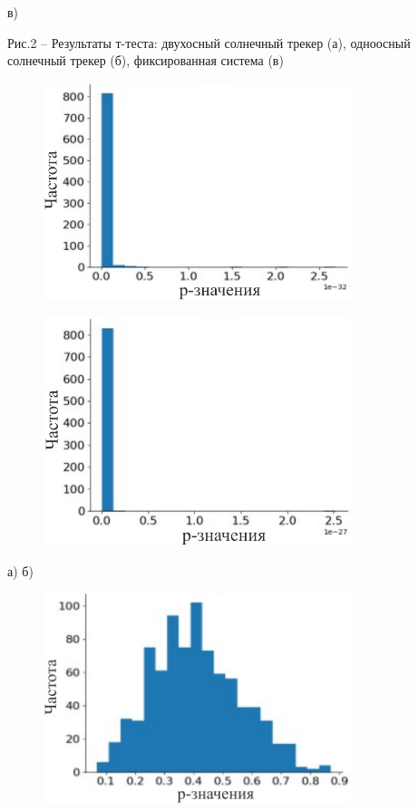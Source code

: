 в)

Рис.2 -- Результаты т-теста: двухосный солнечный трекер (а), одноосный
солнечный трекер (б), фиксированная система (в)


\begin{figure}[H]
	\centering
	\includegraphics[width=0.8\textwidth]{media/ict/image7}
	\caption*{}
\end{figure}

\begin{figure}[H]
	\centering
	\includegraphics[width=0.8\textwidth]{media/ict/image8}
	\caption*{}
\end{figure}


а) б)


\begin{figure}[H]
	\centering
	\includegraphics[width=0.8\textwidth]{media/ict/image9}
	\caption*{}
\end{figure}


